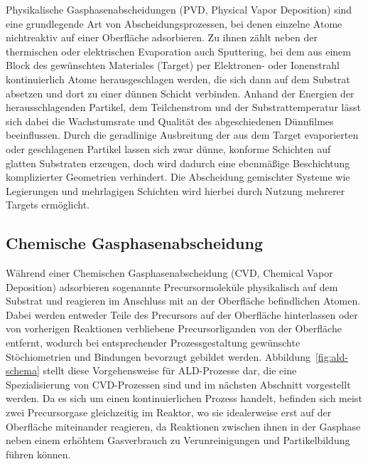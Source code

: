 Physikalische Gasphasenabscheidungen (PVD, Physical Vapor Deposition) sind eine grundlegende Art von Abscheidungsprozessen, bei denen einzelne Atome nichtreaktiv auf einer Oberfläche adsorbieren.
Zu ihnen zählt neben der thermischen oder elektrischen Evaporation auch Sputtering, bei dem aus einem Block des gewünschten Materiales (Target) per Elektronen- oder Ionenstrahl kontinuierlich Atome herausgeschlagen werden, die sich dann auf dem Substrat absetzen und dort zu einer dünnen Schicht verbinden\cite{mattox_handbook_2010,helmersson_ionized_2006}.
Anhand der Energien der herausschlagenden Partikel, dem Teilchenstrom und der Substrattemperatur lässt sich dabei die Wachstumsrate und Qualität des abgeschiedenen Dünnfilmes beeinflussen.
Durch die geradlinige Ausbreitung der aus dem Target evaporierten oder geschlagenen Partikel lassen sich zwar dünne, konforme Schichten auf glatten Substraten erzeugen\cite{svorcik_annealing_2011}, doch wird dadurch eine ebenmäßige Beschichtung komplizierter Geometrien verhindert.
Die Abscheidung gemischter Systeme wie Legierungen und mehrlagigen Schichten wird hierbei durch Nutzung mehrerer Targets ermöglicht\cite{cammarata_nanoindentation_1990}.

\subsection{Chemische Gasphasenabscheidung}

Während einer Chemischen Gasphasenabscheidung (CVD, Chemical Vapor Deposition) adsorbieren sogenannte Precursormoleküle physikalisch auf dem Substrat und reagieren im Anschluss mit an der Oberfläche befindlichen Atomen.
Dabei werden entweder Teile des Precursors auf der Oberfläche hinterlassen oder von vorherigen Reaktionen verbliebene Precursorliganden von der Oberfläche entfernt, wodurch bei entsprechender Prozessgestaltung gewünschte Stöchiometrien und Bindungen bevorzugt gebildet werden\cite{pierson_handbook_1999}.
Abbildung~\ref{fig:ald-schema} stellt diese Vorgehensweise für ALD-Prozesse dar, die eine Spezialisierung von CVD-Prozessen sind und im nächsten Abschnitt vorgestellt werden.
Da es sich um einen kontinuierlichen Prozess handelt, befinden sich meist zwei Precursorgase gleichzeitig im Reaktor, wo sie idealerweise erst auf der Oberfläche miteinander reagieren, da Reaktionen zwischen ihnen in der Gasphase neben einem erhöhtem Gasverbrauch zu Verunreinigungen und Partikelbildung führen können.


